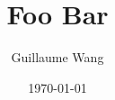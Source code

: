 \documentclass{article}
\title{Foo Bar}
\date{\today}
\author{Guillaume Wang}
\numberwithin{definition}{section}
\numberwithin{theorem}{section}
\numberwithin{corollary}{section}
\numberwithin{proposition}{section}
\numberwithin{lemma}{section}
\numberwithin{claim}{section}
\numberwithin{fact}{section}
\numberwithin{remark}{section}
\numberwithin{example}{section}
\numberwithin{equation}{section}
\newif\ifextended  %
\begin{document}
\maketitle









\printbibliography
{} %

\ifextended%
    \newpage
    \appendix
    \phantomsection
    \addcontentsline{toc}{section}{APPENDIX}

    \section{Proofs}
    
\fi
\end{document}
